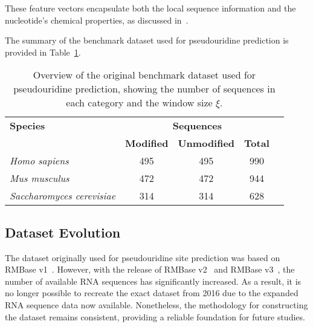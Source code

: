     These feature vectors encapsulate both the local sequence information and the nucleotide's chemical properties, as discussed in~\cite{chen_pseudo_2015}.

    The summary of the benchmark dataset used for pseudouridine prediction is provided in Table~\ref{tab:dataset}.

    \begin{table}[ht]
      \centering
      \begin{tabular}{@{}lcccc@{}}
        \toprule
        \textbf{Species} & \multicolumn{3}{c}{\textbf{Sequences}} \\
        \cmidrule(lr){2-4}
        & \textbf{Modified} & \textbf{Unmodified} & \textbf{Total} & \textbf{} \\
        \midrule
        \textit{Homo sapiens} & 495 & 495 & 990 \\
        \textit{Mus musculus} & 472 & 472 & 944 \\
        \textit{Saccharomyces cerevisiae} & 314 & 314 & 628 \\
        \bottomrule
      \end{tabular}
      \caption{Overview of the original benchmark dataset used for pseudouridine prediction, showing the number of sequences in each category and the window size \(\xi\).}
      \label{tab:dataset}
    \end{table}

  \subsection{Dataset Evolution}\label{subsec:dataset-evolution}
    The dataset originally used for pseudouridine site prediction was based on RMBase v1~\cite{sun_rmbase_2016}.
    However, with the release of RMBase v2~\cite{xuan_rmbase_2018} and RMBase v3~\cite{xuan_rmbase_2024}, the number of available RNA sequences has significantly increased.
    As a result, it is no longer possible to recreate the exact dataset from 2016 due to the expanded RNA sequence data now available.
    Nonetheless, the methodology for constructing the dataset remains consistent, providing a reliable foundation for future studies.